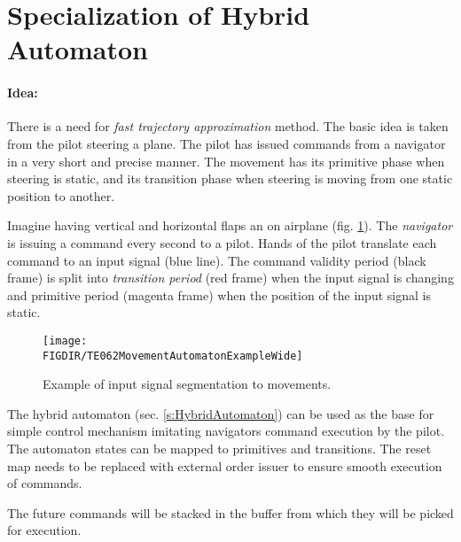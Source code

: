 \section{Specialization of Hybrid Automaton}\label{s:MovementAutomatonBuidlingBlocks}

\paragraph{Idea:} There is  a need for \emph{fast trajectory approximation} method. The basic idea is taken from the pilot steering a plane. The pilot has issued commands from a navigator in a very short and precise manner. The movement has its primitive phase when steering is static, and its transition phase when steering is moving from one static position to another. 

Imagine having vertical and horizontal flaps an on airplane (fig. \ref{fig:movementsExample}). The \emph{navigator} is issuing a command every second to a pilot. Hands of the pilot translate each command to an input signal (blue line). The command validity period (black frame) is split into \emph{transition period} (red frame) when the input signal is changing and primitive period (magenta frame) when the position of the input signal is static.
 
\begin{figure}[H]
    \centering
    \texttt{[image: \\FIGDIR/TE062MovementAutomatonExampleWide]} 
    \caption{Example of input signal segmentation to movements.}
    \label{fig:movementsExample}
\end{figure}

\begin{note}
    The hybrid automaton (sec. \ref{s:HybridAutomaton}) can be used as the base for simple control mechanism imitating navigators command execution by the pilot. The automaton states can be mapped to primitives and transitions. The reset map needs to be replaced with external order issuer to ensure smooth execution of commands.
    
    The future commands will be stacked in the buffer from which they will be picked for execution.
\end{note}



